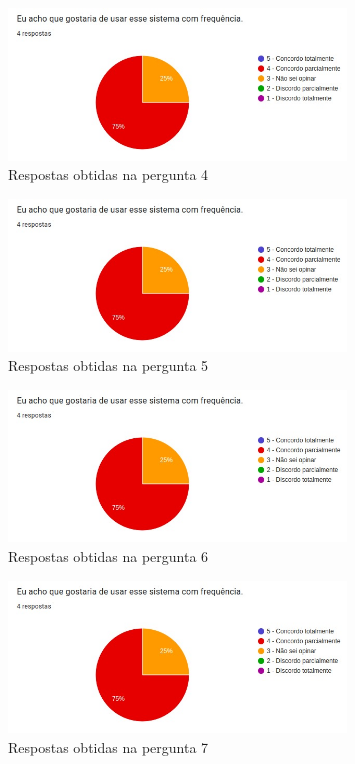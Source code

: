\documentclass[12pt]{tcc}
\begin{document}
	\begin{figure}[!ht]
		\centering
		\includegraphics[width=0.8\textwidth]{figures/respostas-pergunta-4.jpeg}
		\caption{Respostas obtidas na pergunta 4}
		\label{fig:respostas-pergunta-4}
	\end{figure}

	\begin{figure}[!ht]
		\centering
		\includegraphics[width=0.8\textwidth]{figures/respostas-pergunta-5.jpeg}
		\caption{Respostas obtidas na pergunta 5}
		\label{fig:respostas-pergunta-5}
	\end{figure}

	\begin{figure}[!ht]
		\centering
		\includegraphics[width=0.8\textwidth]{figures/respostas-pergunta-6.jpeg}
		\caption{Respostas obtidas na pergunta 6}
		\label{fig:respostas-pergunta-6}
	\end{figure}

	\begin{figure}[!ht]
		\centering
		\includegraphics[width=0.8\textwidth]{figures/respostas-pergunta-7.jpeg}
		\caption{Respostas obtidas na pergunta 7}
		\label{fig:respostas-pergunta-7}
	\end{figure}
\end{document}
